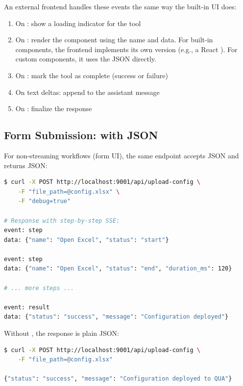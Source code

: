 An external frontend handles these events the same way the built-in UI does:

\begin{enumerate}
    \item On : show a loading indicator for the tool
    \item On : render the component using the  name and  data. For built-in components, the frontend implements its own version (e.g., a React ). For custom components, it uses the  JSON directly.
    \item On : mark the tool as complete (success or failure)
    \item On text deltas: append to the assistant message
    \item On \code{[DONE]}: finalize the response
\end{enumerate}

\subsection{Form Submission:  with JSON}

For non-streaming workflows (form UI), the same endpoint accepts JSON and returns JSON:

\begin{lstlisting}[language=bash,numbers=none]
$ curl -X POST http://localhost:9001/api/upload-config \
    -F "file_path=@config.xlsx" \
    -F "debug=true"

# Response with step-by-step SSE:
event: step
data: {"name": "Open Excel", "status": "start"}

event: step
data: {"name": "Open Excel", "status": "end", "duration_ms": 120}

# ... more steps ...

event: result
data: {"status": "success", "message": "Configuration deployed"}
\end{lstlisting}

Without , the response is plain JSON:

\begin{lstlisting}[language=bash,numbers=none]
$ curl -X POST http://localhost:9001/api/upload-config \
    -F "file_path=@config.xlsx"

{"status": "success", "message": "Configuration deployed to QUA"}
\end{lstlisting}

